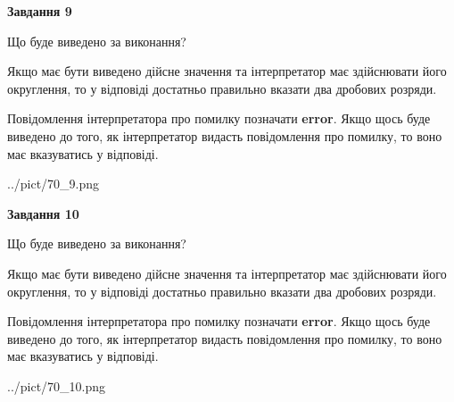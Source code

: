 \documentclass[12pt, ukrainian]{article}
\begin{document}
{\begin {Large}
{\begin {center}\textbf{Завдання 9}\end {center}}\par
Що буде виведено за виконання? \par

Якщо має бути виведено дійсне значення та інтерпретатор має здійснювати його округлення, 
то у відповіді достатньо правильно вказати два дробових розряди.

Повідомлення інтерпретатора про помилку позначати \textbf{error}.
Якщо щось буде виведено до того, як інтерпретатор видасть повідомлення про помилку, 
то воно має вказуватись у відповіді. \par

\begin{center}
	{../pict/70_9.png}
\end{center}
\newpage

{\begin {center}\textbf{Завдання 10}\end {center}}\par
Що буде виведено за виконання? \par

Якщо має бути виведено дійсне значення та інтерпретатор має здійснювати його округлення, 
то у відповіді достатньо правильно вказати два дробових розряди.

Повідомлення інтерпретатора про помилку позначати \textbf{error}.
Якщо щось буде виведено до того, як інтерпретатор видасть повідомлення про помилку, 
то воно має вказуватись у відповіді. \par

\begin{center}
	{../pict/70_10.png}
\end{center}
\newpage

\end {Large}}
\end{document}
